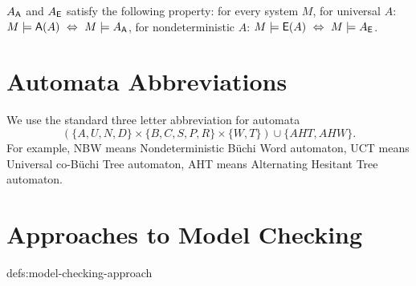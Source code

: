 $A_{\operatorname{\mathsf{A}}}$ and $A_{\operatorname{\mathsf{E}}}$ satisfy the following property:
for every system $M$,
\li
\- for universal $A$: $M \models {\ensuremath{\operatorname{\mathsf{A}}}}(A) ~\Leftrightarrow~ M \models A_{\operatorname{\mathsf{A}}}$,
\- for nondeterministic $A$: $M \models {\ensuremath{\operatorname{\mathsf{E}}}}(A) ~\Leftrightarrow~ M \models A_{\operatorname{\mathsf{E}}}$.
\il



%
%


\section*{Automata Abbreviations}\label{defs:automata-abbrv}
We use the standard three letter abbreviation for automata
$$(\{A,U,N,D\}\times\{B,C,S,P,R\}\times\{W,T\}) \cup \{AHT, AHW\}.$$
For example,
NBW means Nondeterministic B\"uchi Word automaton,
UCT means Universal co-B\"uchi Tree automaton,
AHT means Alternating Hesitant Tree automaton.

\toclesslab\section{Approaches to Model Checking}{defs:model-checking-approach}

